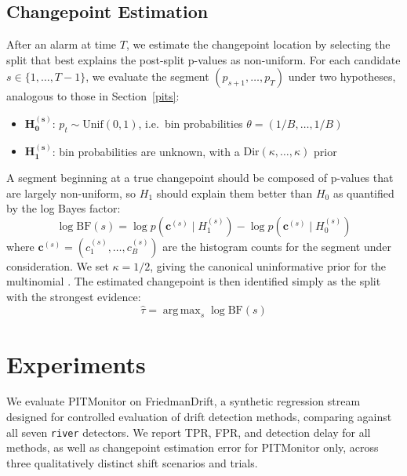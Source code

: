\documentclass[ejsv2, noshowframe]{imsart}
\theoremstyle{plain}
\theoremstyle{definition}
\theoremstyle{remark}
\DeclareMathOperator*{\argmax}{arg\,max}
\begin{document}
\subsection{Changepoint Estimation}
\label{sec:changepoint}

After an alarm at time $T$, we estimate the changepoint location by selecting the split that best explains the post-split p-values as non-uniform. For each candidate $s \in \{1, \ldots, T-1\}$, we evaluate the segment $(p_{s+1}, \ldots, p_T)$ under two hypotheses, analogous to those in Section~\ref{pits}:
\begin{itemize}
 \item $\mathbf{H_0^{(s)}}$: $p_t \sim \mathrm{Unif}(0,1)$, 
 i.e.\ bin probabilities $\theta = (1/B, \ldots, 1/B)$
 \item $\mathbf{H_1^{(s)}}$: bin probabilities are unknown, with a $\mathrm{Dir}(\kappa, \ldots, \kappa)$ prior
\end{itemize}
A segment beginning at a true changepoint should be composed of p-values that are largely non-uniform, so $H_1$ should explain them better than $H_0$ as quantified by the log Bayes factor:
\begin{equation}
 \log\mathrm{BF}(s) = \log p(\mathbf{c}^{(s)} \mid H_1^{(s)}) - \log p(\mathbf{c}^{(s)} \mid H_0^{(s)})
\end{equation}
where $\mathbf{c}^{(s)} = (c_1^{(s)}, \ldots, c_B^{(s)})$ are the histogram counts for the segment under consideration. We set $\kappa = 1/2$, giving the canonical uninformative prior for the multinomial \citep{jeffreys1961}. The estimated changepoint is then identified simply as the split with the strongest evidence:
\begin{equation}
 \hat{\tau} = \argmax_s \log\mathrm{BF}(s)
\end{equation}

\section{Experiments}
\label{sec:experiments}

We evaluate PITMonitor on FriedmanDrift, a synthetic regression stream designed for controlled evaluation of drift detection methods, comparing against all seven \texttt{river} detectors. We report TPR, FPR, and detection delay for all methods, as well as changepoint estimation error for PITMonitor only, across three qualitatively distinct shift scenarios and \expNtrials{} trials.
\end{document}
